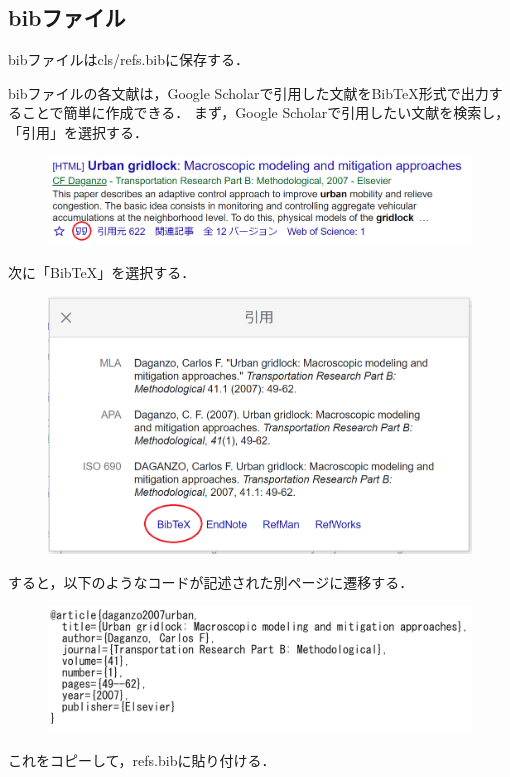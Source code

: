 \documentclass[../main/main]{subfiles}
\begin{document}
\subsection{bibファイル}
bibファイルはcls/refs.bibに保存する．
\par
bibファイルの各文献は，Google Scholarで引用した文献をBibTeX形式で出力することで簡単に作成できる．
まず，Google Scholarで引用したい文献を検索し，「引用」を選択する．
\begin{figure}[!ht]
  \centering
  \includegraphics[clip, width=0.5\columnwidth]{image/bib1.png}
  \label{fig:bib1}
\end{figure}
\par
次に「BibTeX」を選択する．
\begin{figure}[!ht]
  \centering
  \includegraphics[clip, width=0.5\columnwidth]{image/bib2.png}
  \label{fig:bib1}
\end{figure}
\par
すると，以下のようなコードが記述された別ページに遷移する．
\begin{figure}[!ht]
  \centering
  \includegraphics[clip, width=0.5\columnwidth]{image/bib3.png}
  \label{fig:bib1}
\end{figure}
\par
これをコピーして，refs.bibに貼り付ける．
\end{document}

